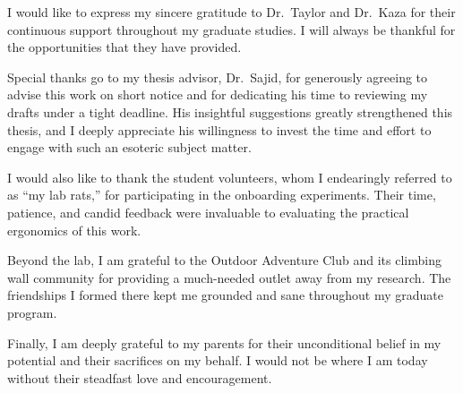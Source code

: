 

I would like to express my sincere gratitude to Dr.~Taylor and Dr.~Kaza for their continuous support throughout my graduate studies. I will always be thankful for the opportunities that they have provided. 

Special thanks go to my thesis advisor, Dr.~Sajid, for generously agreeing to advise this work on short notice and for dedicating his time to reviewing my drafts under a tight deadline. His insightful suggestions greatly strengthened this thesis, and I deeply appreciate his willingness to invest the time and effort to engage with such an esoteric subject matter.

I would also like to thank the student volunteers, whom I endearingly referred to as ``my lab rats,'' for participating in the onboarding experiments. Their time, patience, and candid feedback were invaluable to evaluating the practical ergonomics of this work.

Beyond the lab, I am grateful to the Outdoor Adventure Club and its climbing wall community for providing a much-needed outlet away from my research. The friendships I formed there kept me grounded and sane throughout my graduate program.

Finally, I am deeply grateful to my parents for their unconditional belief in my potential and their sacrifices on my behalf. I would not be where I am today without their steadfast love and encouragement.


